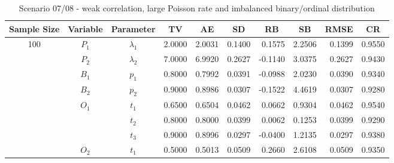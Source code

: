 \documentclass[letterpaper]{article}
\begin{document}
\begin{table}[h]
\centering
\caption{Scenario 07/08 - weak correlation, large Poisson rate and imbalanced binary/ordinal distribution}
\begin{tabular}{cccrrrrrrr}
\hline
Sample Size & Variable    & Parameter      & \multicolumn{1}{c}{TV} & \multicolumn{1}{c}{AE} & \multicolumn{1}{c}{SD} & \multicolumn{1}{c}{RB} & \multicolumn{1}{c}{SB} & \multicolumn{1}{c}{RMSE} & \multicolumn{1}{c}{CR} \\ \hline
100         & $P_1$       & $\lambda_1$    & 2.0000                 & 2.0031                 & 0.1400                 & 0.1575                 & 2.2506                 & 0.1399                   & 0.9550                 \\
            & $P_2$       & $\lambda_2$    & 7.0000                 & 6.9920                 & 0.2627                 & -0.1140                & 3.0375                 & 0.2627                   & 0.9430                 \\
            & $B_1$       & $p_1$          & 0.8000                 & 0.7992                 & 0.0391                 & -0.0988                & 2.0230                 & 0.0390                   & 0.9340                 \\
            & $B_2$       & $p_2$          & 0.9000                 & 0.8986                 & 0.0307                 & -0.1522                & 4.4619                 & 0.0307                   & 0.9280                 \\
            & $O_1$       & $t_1$          & 0.6500                 & 0.6504                 & 0.0462                 & 0.0662                 & 0.9304                 & 0.0462                   & 0.9540                 \\
            &             & $t_2$          & 0.8000                 & 0.8000                 & 0.0399                 & 0.0062                 & 0.1253                 & 0.0399                   & 0.9290                 \\
            &             & $t_3$          & 0.9000                 & 0.8996                 & 0.0297                 & -0.0400                & 1.2135                 & 0.0297                   & 0.9380                 \\
            & $O_2$       & $t_1$          & 0.5000                 & 0.5013                 & 0.0509                 & 0.2660                 & 2.6108                 & 0.0509                   & 0.9350                 \\

\end{tabular}
\end{table}
\end{document}
